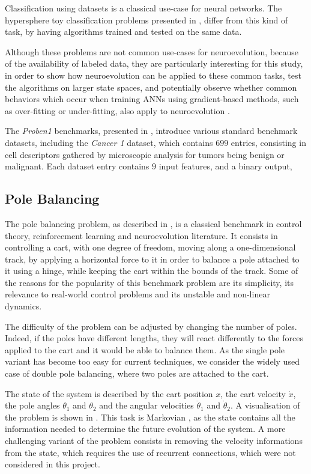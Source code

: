 Classification using datasets is a classical use-case for neural networks.
The hypersphere toy classification problems \cite{na,} presented in , differ from this kind of task, by having
algorithms trained and tested on the same data.

Although these problems are not common use-cases for neuroevolution, because of the availability of labeled data,
they are particularly interesting for this study, in order to show how neuroevolution can be applied to these common tasks, test
the algorithms on larger state spaces, and potentially observe whether common behaviors which occur when training ANNs using gradient-based methods,
such as over-fitting or under-fitting, also apply to neuroevolution \cite{overfitting}.

The \textit{Proben1} benchmarks, presented in \cite{proben}, introduce various standard benchmark datasets, including the \textit{Cancer 1} dataset, which
contains $699$ entries, consisting in cell descriptors gathered by microscopic analysis for tumors being benign or malignant.
Each dataset entry contains $9$ input features, and a binary output,

\subsection{Pole Balancing}

The pole balancing problem, as described in \cite{pole_balancing}, is a classical benchmark in control theory, reinforcement learning and neuroevolution literature.
It consists in controlling a cart, with one degree of freedom, moving along a one-dimensional track, by applying a horizontal force to it in order to balance a pole attached to it using a hinge,
while keeping the cart within the bounds of the track.
Some of the reasons for the popularity of this benchmark problem are its simplicity, its relevance to real-world control problems and its unstable and non-linear dynamics.


The difficulty of the problem can be adjusted by changing the number of poles. Indeed, if the poles have different lengths, they will react differently to the forces applied to the cart
and it would be able to balance them.
As the single pole variant has become too easy for current techniques, we consider the widely used case of double pole balancing, where two poles are attached to the cart.

The state of the system is described by the cart position $x$, the cart velocity $\dot{x}$, the pole angles $\theta_1$ and $\theta_2$ and the angular velocities $\dot{\theta}_1$ and $\dot{\theta}_2$.
A visualisation of the problem is shown in .
This task is Markovian \cite{markov}, as the state contains all the information needed to determine the future evolution of the system.
A more challenging variant of the problem consists in removing the velocity informations from the state, which requires the use of recurrent connections, which were not considered
in this project.

